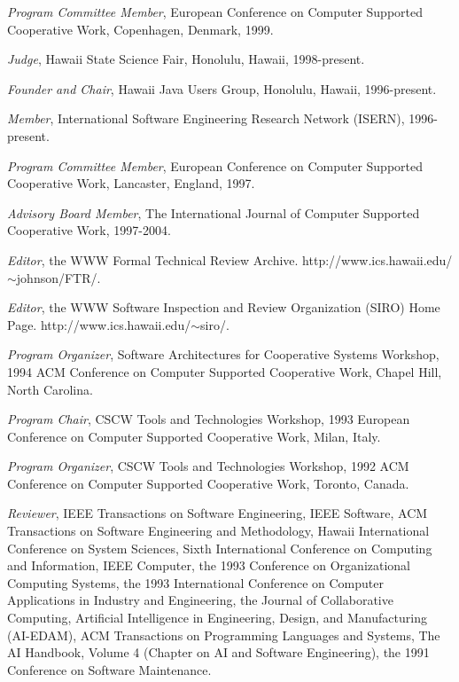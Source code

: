\begin{Professional Activities}
\item {\em Program Committee Member}, 
  European Conference on Computer Supported Cooperative Work, 
  Copenhagen, Denmark, 1999.

\item {\em Judge}, 
  Hawaii State Science Fair,
  Honolulu, Hawaii, 1998-present.

\item {\em Founder and Chair}, 
  Hawaii Java Users Group,
  Honolulu, Hawaii, 1996-present.

\item {\em Member}, International Software Engineering Research Network
(ISERN), 1996-present. 

\item {\em Program Committee Member}, 
  European Conference on Computer Supported Cooperative Work, Lancaster,
  England, 1997.

\item {\em Advisory Board Member}, 
  The International Journal of Computer Supported Cooperative Work, 1997-2004.

\item {\em Editor}, the WWW Formal Technical Review Archive.  \newline
  http://www.ics.hawaii.edu/$\sim$johnson/FTR/.

\item {\em Editor}, the WWW Software Inspection and Review Organization
(SIRO) Home Page. \newline
  http://www.ics.hawaii.edu/$\sim$siro/.

\item {\em Program Organizer}, Software Architectures for Cooperative
  Systems Workshop, 1994 ACM Conference on Computer Supported Cooperative Work,
  Chapel Hill, North Carolina.

\item {\em Program Chair}, CSCW Tools and Technologies Workshop, 1993
  European Conference on Computer Supported Cooperative Work, Milan, Italy.
  
\item {\em Program Organizer}, CSCW Tools and Technologies Workshop,
  1992 ACM Conference on Computer Supported Cooperative Work, Toronto, Canada.
  
\item {\em Reviewer}, IEEE Transactions on Software Engineering, IEEE
Software, ACM Transactions on Software Engineering and
  Methodology, Hawaii International Conference on System Sciences, Sixth International Conference on Computing and Information,
  IEEE Computer, the 1993 Conference on Organizational Computing Systems, the
  1993 International Conference on Computer Applications in Industry and
  Engineering, the Journal of Collaborative Computing, Artificial
  Intelligence in Engineering, Design, and Manufacturing (AI-EDAM), ACM
  Transactions on Programming Languages and Systems, The AI Handbook, Volume
  4 (Chapter on AI and Software Engineering), the 1991 Conference on Software
  Maintenance.


\end{Professional Activities}


